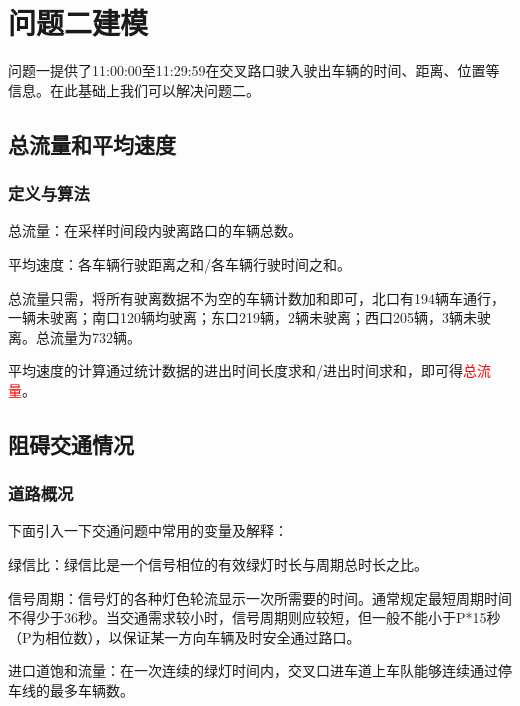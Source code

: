 \section{问题二建模}
问题一提供了11:00:00至11:29:59在交叉路口驶入驶出车辆的时间、距离、位置等信息。在此基础上我们可以解决问题二。

\subsection{总流量和平均速度}

\subsubsection{定义与算法}
总流量：在采样时间段内驶离路口的车辆总数。

平均速度：各车辆行驶距离之和/各车辆行驶时间之和。

总流量只需，将所有驶离数据不为空的车辆计数加和即可，北口有194辆车通行，一辆未驶离；南口120辆均驶离；东口219辆，2辆未驶离；西口205辆，3辆未驶离。总流量为732辆。

平均速度的计算通过统计数据的进出时间长度求和/进出时间求和，即可得\textcolor{red}{总流量}。

\subsection{阻碍交通情况}

\subsubsection{道路概况}

下面引入一下交通问题中常用的变量及解释：


绿信比：绿信比是一个信号相位的有效绿灯时长与周期总时长之比。

信号周期：信号灯的各种灯色轮流显示一次所需要的时间。通常规定最短周期时间不得少于36秒。当交通需求较小时，信号周期则应较短，但一般不能小于P*15秒（P为相位数），以保证某一方向车辆及时安全通过路口。

进口道饱和流量：在一次连续的绿灯时间内，交叉口进车道上车队能够连续通过停车线的最多车辆数。

